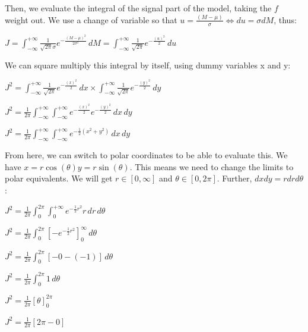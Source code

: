 \documentclass[12pt]{report} %
\begin{document}
\vspace*{1\baselineskip}
Then, we evaluate the integral of the signal part of the model, taking the $f$ weight out. We use a change of variable so that $u = \frac{(M-\mu)}{\sigma} \iff du = \sigma dM$, thus:

\vspace*{1\baselineskip}
$J = \displaystyle \int_{-\infty}^{+\infty} \frac{1}{\sqrt{2\pi}\sigma} e^{-\frac{{(M - \mu)}^{2}}{2\sigma^{2}}}\, dM = \displaystyle \int_{-\infty}^{+\infty} \frac{1}{\sqrt{2\pi}} e^{-\frac{{(u)}^{2}}{2}}\, du$  

\vspace*{1\baselineskip}
We can square multiply this integral by itself, using dummy variables x and y:  

\vspace*{1\baselineskip}
$J^{2} = \displaystyle \int_{-\infty}^{+\infty} \frac{1}{\sqrt{2\pi}} e^{-\frac{{(x)}^{2}}{2}}\, dx \times \displaystyle \int_{-\infty}^{+\infty} \frac{1}{\sqrt{2\pi}} e^{-\frac{{(y)}^{2}}{2}}\, dy$  

$J^{2} = \frac{1}{2\pi}\displaystyle \int_{-\infty}^{+\infty} \int_{-\infty}^{+\infty}  e^{-\frac{{(x)}^{2}}{2}} e^{-\frac{{(y)}^{2}}{2}}\, dx \, dy$  

$J^{2} = \frac{1}{2\pi}\displaystyle \int_{-\infty}^{+\infty} \int_{-\infty}^{+\infty} e^{-\frac{1}{2}(x^{2}+y^{2})}\, dx \, dy$  

\vspace*{1\baselineskip}
From here, we can switch to polar coordinates to be able to evaluate this. We have $x = r\cos{(\theta)} y = r\sin{(\theta)}$. This means we need to change the limits to polar equivalents. We will get $r \in{[0,\infty]}$ and $\theta \in{[0,2\pi]}$. Further, $dx dy = r dr d\theta$:  

\vspace*{1\baselineskip}
$J^{2} = \frac{1}{2\pi}\displaystyle \int_{0}^{2\pi} \int_{0}^{+\infty} e^{-\frac{1}{2}r^{2}}r\, dr \, d\theta$  

$J^{2} = \frac{1}{2\pi}\displaystyle \int_{0}^{2\pi} {[-e^{-\frac{1}{2}r^{2}}]}_{0}^{\infty}\, d\theta$  

$J^{2} = \frac{1}{2\pi}\displaystyle \int_{0}^{2\pi} [-0 - (-1)]\, d\theta$  

$J^{2} = \displaystyle \frac{1}{2\pi}\displaystyle \int_{0}^{2\pi} 1\, d\theta$  

$J^{2} = \displaystyle \frac{1}{2\pi}\displaystyle {[\theta]}_{0}^{2\pi}$  

$J^{2} = \displaystyle \frac{1}{2\pi}\displaystyle {[2\pi - 0]}$  
\end{document}
